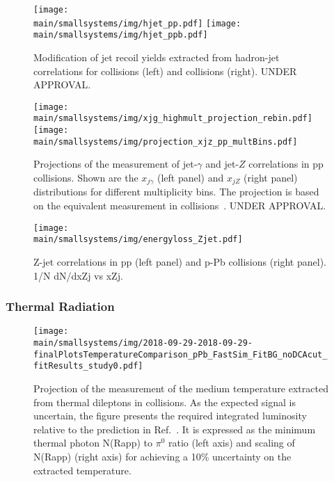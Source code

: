 \documentclass[../report.tex]{subfiles}
\providecommand{\main}{..}
\begin{document}
\begin{figure}[ht]
\centering
\texttt{[image: \\main/smallsystems/img/hjet\_pp.pdf]}
\hfill
\texttt{[image: \\main/smallsystems/img/hjet\_ppb.pdf]}
\caption{Modification of jet recoil yields extracted from hadron-jet correlations for \pp{} collisions (left) and \pPb{} collisions (right). UNDER APPROVAL.}
\label{fig:smallsystems_energyloss_hjet}
\end{figure}

\begin{figure}[ht]
\centering
\texttt{[image: \\main/smallsystems/img/xjg\_highmult\_projection\_rebin.pdf]}
\hfill
\texttt{[image: \\main/smallsystems/img/projection\_xjz\_pp\_multBins.pdf]}
\caption{Projections of the measurement of jet-$\gamma$ and jet-$Z$ correlations in pp collisions. Shown are the $x_{j\gamma}$ (left panel) and $x_{jZ}$ (right panel) distributions for different multiplicity bins. The projection is based on the equivalent measurement in \pPb{} collisions~\cite{}. UNDER APPROVAL.} 
\label{fig:smallsystems_energyloss_xjg}
\end{figure}

\begin{figure}[ht]
\centering
\texttt{[image: \\main/smallsystems/img/energyloss\_Zjet.pdf]}

\caption{Z-jet correlations in pp (left panel) and p-Pb collisions (right panel). 1/N dN/dxZj vs xZj.}
\label{fig:smallsystems_energyloss_Zjet}
\end{figure}

\subsubsection{Thermal Radiation}

\begin{figure}[ht]
\centering
\texttt{[image: \\main/smallsystems/img/2018-09-29-2018-09-29-finalPlotsTemperatureComparison\_pPb\_FastSim\_FitBG\_noDCAcut\_fitResults\_study0.pdf]}
\caption{Projection of the measurement of the medium temperature extracted from thermal dileptons in \pPb{} collisions. As the expected signal is uncertain, the figure presents the required integrated luminosity relative to the prediction in Ref.~\cite{}. It is expressed as the minimum thermal photon N(Rapp) to $\pi^0$ ratio (left axis) and scaling of N(Rapp) (right axis) for achieving a 10\% uncertainty on the extracted temperature.}
\label{fig:smallsystems_thermal_radition}
\end{figure}
\end{document}
